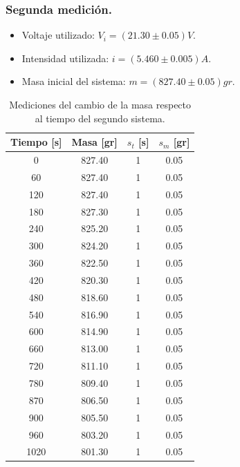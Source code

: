 \documentclass[a4paper]{article}
\begin{document}
\subsubsection*{Segunda medición.}
\begin{itemize}
    \item Voltaje utilizado: $V_i = (21.30\pm0.05)V$.
    \item Intensidad utilizada: $i = (5.460\pm0.005)A$.
    \item Masa inicial del sistema: $m = (827.40\pm0.05)gr$.
\end{itemize}
\begin{table}[H]
  \centering
    \begin{tabular}{|c|c|c|c|} \hline
    \multicolumn{1}{|l|}{Tiempo [s]} & \multicolumn{1}{|l|}{Masa [gr]} & \multicolumn{1}{|l|}{$s_t$ [s]} & \multicolumn{1}{|l|}{$s_m$ [gr]} \\ \hline
    0     & 827.40 & 1     & 0.05 \\ \hline
    60    & 827.40 & 1     & 0.05 \\ \hline
    120   & 827.40 & 1     & 0.05 \\ \hline
    180   & 827.30 & 1     & 0.05 \\ \hline
    240   & 825.20 & 1     & 0.05 \\ \hline
    300   & 824.20 & 1     & 0.05 \\ \hline
    360   & 822.50 & 1     & 0.05 \\ \hline
    420   & 820.30 & 1     & 0.05 \\ \hline
    480   & 818.60 & 1     & 0.05 \\ \hline
    540   & 816.90 & 1     & 0.05 \\ \hline
    600   & 814.90 & 1     & 0.05 \\ \hline
    660   & 813.00 & 1     & 0.05 \\ \hline
    720   & 811.10 & 1     & 0.05 \\ \hline
    780   & 809.40 & 1     & 0.05 \\ \hline
    870   & 806.50 & 1     & 0.05 \\ \hline
    900   & 805.50 & 1     & 0.05 \\ \hline
    960   & 803.20 & 1     & 0.05 \\ \hline
    1020  & 801.30 & 1     & 0.05 \\ \hline
    \end{tabular}%
  \caption{Mediciones del cambio de la masa respecto al tiempo del segundo sistema.}
\end{table}%
\end{document}
